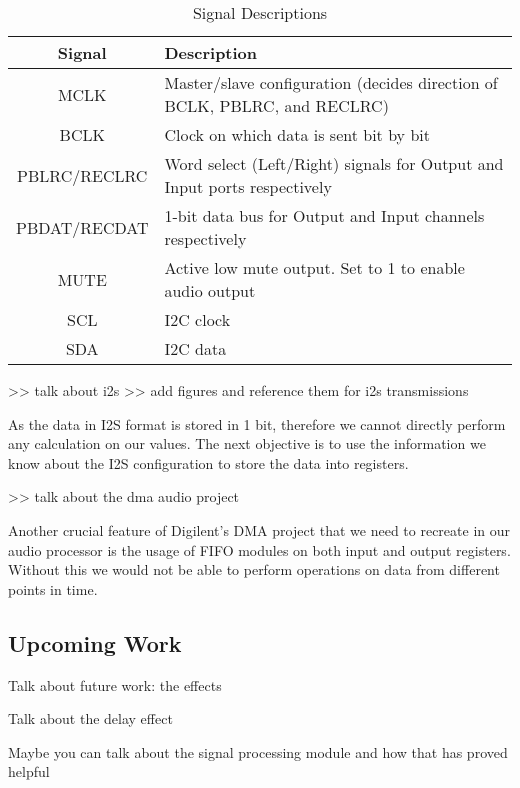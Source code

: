\begin{table}[h]
    \centering
    \begin{tabular}{|c|p{8cm}|}
        \hline
        \textbf{Signal} & \textbf{Description} \\
        \hline
        MCLK & Master/slave configuration (decides direction of BCLK, PBLRC, and RECLRC) \\
        \hline
        BCLK & Clock on which data is sent bit by bit \\
        \hline
        PBLRC/RECLRC & Word select (Left/Right) signals for Output and Input ports respectively \\
        \hline
        PBDAT/RECDAT & 1-bit data bus for Output and Input channels respectively \\
        \hline
        MUTE & Active low mute output. Set to 1 to enable audio output \\
        \hline
        SCL & I2C clock \\
        \hline
        SDA & I2C data \\
        \hline
    \end{tabular}
    \caption{Signal Descriptions}
    \label{tab:signals}
\end{table}

>> talk about i2s
>> add figures and reference them for i2s transmissions

As the data in I2S format is stored in 1 bit, therefore we cannot directly perform any calculation on our values. The next objective is to use the information we know about the I2S configuration to store the data into registers.

>> talk about the dma audio project

Another crucial feature of Digilent's DMA project that we need to recreate in our audio processor is the usage of FIFO modules on both input and output registers. Without this we would not be able to perform operations on data from different points in time.



\subsection{Upcoming Work}

Talk about future work: the effects

Talk about the delay effect

Maybe you can talk about the signal processing module and how that has proved helpful